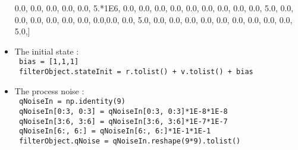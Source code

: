 \begin{itemize}
{                              0.0, 0.0, 0.0, 0.0, 0.0, 5.*1E6, 0.0, 0.0, 0.0,
                              0.0, 0.0, 0.0, 0.0, 0.0, 0.0, 5.0, 0.0, 0.0,
                              0.0, 0.0, 0.0, 0.0, 0.0,0.0, 0.0, 5.0, 0.0,
                              0.0, 0.0, 0.0, 0.0, 0.0, 0.0, 0.0, 0.0, 5.0,]}
 \item The initial state :\\
  \texttt{     bias = [1,1,1] } \\ 
  \texttt{      filterObject.stateInit = r.tolist() + v.tolist() + bias }
    \item The process noise :\\
  \texttt{     qNoiseIn = np.identity(9)} \\
  \texttt{     qNoiseIn[0:3, 0:3] = qNoiseIn[0:3, 0:3]*1E-8*1E-8} \\
  \texttt{     qNoiseIn[3:6, 3:6] = qNoiseIn[3:6, 3:6]*1E-7*1E-7} \\
  \texttt{     qNoiseIn[6:, 6:] = qNoiseIn[6:, 6:]*1E-1*1E-1} \\
  \texttt{     filterObject.qNoise = qNoiseIn.reshape(9*9).tolist()}
\end{itemize}


